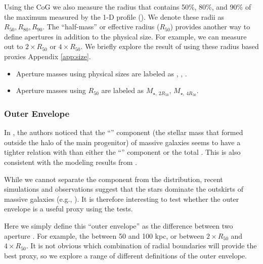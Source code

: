 \documentclass[fleqn,usenatbib,useAMS,english]{mnras}
\begin{document}
    Using the CoG we also measure the radius that contains 50\%, 80\%, and 90\% of the maximum
    \mstar{} measured by the 1-D profile (\mmax{}).
    We denote these radii as $R_{50}, R_{80}, R_{90}$.
    The ``half-mass'' or effective radius ($R_{50}$) provides another way to define apertures
    in addition to the physical size.
    For example, we can measure \mstar{} out to $2\times R_{50}$ or $4\times R_{50}$.
    We briefly explore the result of using these radius based proxies Appendix
    \ref{app:size}.

    \begin{itemize}
        \item Aperture masses using physical sizes are labeled as , ,
        .

        \item Aperture masses using $R_{50}$ are labeled as $M_{\star,\ 2R_{50}}$, $M_{\star,\
           4R_{50}}$.
    \end{itemize}

\subsubsection{Outer Envelope \mstar{}}
    \label{sec:menvelope}

    In \citet{Bradshaw2020}, the authors noticed that the ``\exsitu{}'' component
    (the stellar mass that formed outside the halo of the main progenitor)
    of massive galaxies seems to have a tighter relation with \mvir{} than either the ``\insitu{}'' component
    or the total \mstar{}.
    This is also consistent with the modeling results from \citet{Huang2020}.

    While we cannot separate the \exsitu{} component from the \mstar{} distribution,
    recent simulations and observations suggest that the \exsitu{} stars dominate the
    outskirts of massive galaxies (e.g., \citealt{Lackner2012, RodriguezGomez2016, Pulsoni2021}).
    It is therefore interesting to test whether the outer envelope \mstar{} is a useful \mvir{}
    proxy using the \topn{} tests.

    Here we simply define this ``outer envelope'' \mstar{} as the difference between
    two aperture \mstar{}.
    For example, the \mstar{} between 50 and 100 kpc, or between $2 \times R_{50}$ and
    $4 \times R_{50}$.
    It is not obvious which combination of radial boundaries will provide the best
    \exsitu{} \mstar{} proxy, so we explore a range of different definitions of the
    outer envelope.
\end{document}
